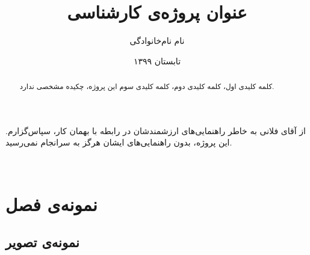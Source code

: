 \documentclass[BScThesis, onesided]{thesis}
\begin{document}

\date{\vspace{0.8cm}
	تابستان ۱۳۹۹
}
\title{\LARGE
عنوان پروژه‌ی کارشناسی 
}
\author{نام نام‌خانوادگی}
\subject{مهندسی برق گرایش سیستم‌ها و شبکه‌های مخابراتی}
\frontmatter
\makethesistitle \pagestyle{empty} \baselineskip



\begin{قدردانی}
از آقای فلانی به خاطر راهنمایی‌های ارزشمندشان در رابطه با بهمان کار، سپاس‌گزارم. 
این پروژه، بدون راهنمایی‌های ایشان هرگز به سرانجام نمی‌رسید.
\end{قدردانی}


\begin{abstract}
{کلمه کلیدی اول، کلمه کلیدی دوم، کلمه کلیدی سوم} 
این پروژه، چکیده مشخصی ندارد.
\end{abstract}


\pagestyle{plain}\tableofcontents\listoffigures
~~
\paragraphfootnotes %


\chapter{نمونه‌ی فصل}

\ptext

\section{نمونه‌ی تصویر}
\end{document}
